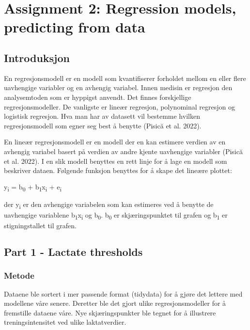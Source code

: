 \documentclass[
  letterpaper,
  DIV=11,
  numbers=noendperiod]{scrreprt}
\begin{document}

\chapter{Assignment 2: Regression models, predicting from
data}\label{assignment2}

\section{Introduksjon}\label{introduksjon-2}

En regresjonsmodell er en modell som kvantifiserer forholdet mellom en
eller flere uavhengige variabler og en avhengig variabel. Innen medisin
er regresjon den analysemtoden som er hyppigst anvendt. Det finnes
forskjellige regresjonsmodeller. De vanligste er lineær regresjon,
polynominal regresjon og logistisk regresjon. Hva man har av datasett
vil bestemme hvilken regresjonsmodell som egner seg best å benytte
(Pisică et al. 2022).

En lineær regresjonsmodell er en modell der en kan estimere verdien av
en avhengig variabel basert på verdien av andre kjente uavhengige
variabler (Pisică et al. 2022). I en slik modell benyttes en rett linje
for å lage en modell som beskriver dataen. Følgende funksjon benyttes
for å skape det lineære plottet:

y\textsubscript{i} = b\textsubscript{0} +
b\textsubscript{1}x\textsubscript{i} + e\textsubscript{i}

der y\textsubscript{i} er den avhengige variabelen som kan estimeres ved
å benytte de uavhengige variablene b\textsubscript{1}x\textsubscript{i}
og b\textsubscript{0}. b\textsubscript{0} er skjæringspunktet til grafen
og b\textsubscript{1} er stigningstallet til grafen.

\section{Part 1 - Lactate thresholds}\label{part-1---lactate-thresholds}

\subsection{Metode}\label{metode-1}

Dataene ble sortert i mer passende format (tidydata) for å gjøre det
lettere med modellene våre senere. Deretter ble det gjort ulike
regresjonsmodeller for å fremstille dataene våre. Nye skjæringspunkter
ble tegnet for å illustrere treningsintensitet ved ulike laktatverdier.
\end{document}
